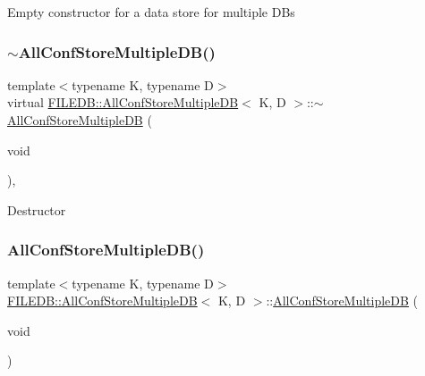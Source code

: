 Empty constructor for a data store for multiple D\+Bs \mbox{\label{classFILEDB_1_1AllConfStoreMultipleDB_a88489be8d488c6fe3a88312f200e7fdd}} 
\subsubsection{\texorpdfstring{$\sim$AllConfStoreMultipleDB()}{~AllConfStoreMultipleDB()}\hspace{0.1cm}{\footnotesize\ttfamily [1/2]}}
{\footnotesize\ttfamily template$<$typename K, typename D$>$ \\
virtual \mbox{\hyperlink{classFILEDB_1_1AllConfStoreMultipleDB}{F\+I\+L\+E\+D\+B\+::\+All\+Conf\+Store\+Multiple\+DB}}$<$ K, D $>$\+::$\sim$\mbox{\hyperlink{classFILEDB_1_1AllConfStoreMultipleDB}{All\+Conf\+Store\+Multiple\+DB}} (\begin{DoxyParamCaption}\item[{void}]{ }\end{DoxyParamCaption})\hspace{0.3cm}{\ttfamily [inline]}, {\ttfamily [virtual]}}

Destructor \mbox{\label{classFILEDB_1_1AllConfStoreMultipleDB_a0c45fce64168ca576e875747eb599927}} 
\subsubsection{\texorpdfstring{AllConfStoreMultipleDB()}{AllConfStoreMultipleDB()}\hspace{0.1cm}{\footnotesize\ttfamily [2/2]}}
{\footnotesize\ttfamily template$<$typename K, typename D$>$ \\
\mbox{\hyperlink{classFILEDB_1_1AllConfStoreMultipleDB}{F\+I\+L\+E\+D\+B\+::\+All\+Conf\+Store\+Multiple\+DB}}$<$ K, D $>$\+::\mbox{\hyperlink{classFILEDB_1_1AllConfStoreMultipleDB}{All\+Conf\+Store\+Multiple\+DB}} (\begin{DoxyParamCaption}\item[{void}]{ }\end{DoxyParamCaption})\hspace{0.3cm}{\ttfamily [inline]}}

